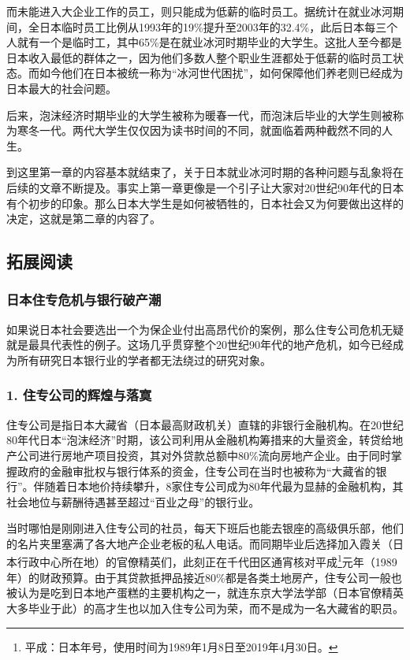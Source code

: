 而未能进入大企业工作的员工，则只能成为低薪的临时员工。据统计在就业冰河期间，全日本临时员工比例从1993年的19\%提升至2003年的32.4\%，此后日本每三个人就有一个是临时工，其中65\%是在就业冰河时期毕业的大学生。这批人至今都是日本收入最低的群体之一，因为他们多数人整个职业生涯都处于低薪的临时员工状态。而如今他们在日本被统一称为“冰河世代困扰”，如何保障他们养老则已经成为日本最大的社会问题。

后来，泡沫经济时期毕业的大学生被称为暖春一代，而泡沫后毕业的大学生则被称为寒冬一代。两代大学生仅仅因为读书时间的不同，就面临着两种截然不同的人生。

到这里第一章的内容基本就结束了，关于日本就业冰河时期的各种问题与乱象将在后续的文章不断提及。事实上第一章更像是一个引子让大家对20世纪90年代的日本有个初步的印象。那么日本大学生是如何被牺牲的，日本社会又为何要做出这样的决定，这就是第二章的内容了。

\subsection{拓展阅读}

\subsubsection{日本住专危机与银行破产潮}

{\fangsong 如果说日本社会要选出一个为保企业付出高昂代价的案例，那么住专公司危机无疑就是最具代表性的例子。这场几乎贯穿整个20世纪90年代的地产危机，如今已经成为所有研究日本银行业的学者都无法绕过的研究对象。\par}

\subsubsection{1. 住专公司的辉煌与落寞}

{\fangsong 住专公司是指日本大藏省（日本最高财政机关）直辖的非银行金融机构。在20世纪80年代日本“泡沫经济”时期，该公司利用从金融机构筹措来的大量资金，转贷给地产公司进行房地产项目投资，其对外贷款总额中80\%流向房地产企业。由于同时掌握政府的金融审批权与银行体系的资金，住专公司在当时也被称为“大藏省的银行”。伴随着日本地价持续攀升，8家住专公司成为80年代最为显赫的金融机构，其社会地位与薪酬待遇甚至超过“百业之母”的银行业。\par}

{\fangsong 当时哪怕是刚刚进入住专公司的社员，每天下班后也能去银座的高级俱乐部，他们的名片夹里塞满了各大地产企业老板的私人电话。而同期毕业后选择加入霞关（日本行政中心所在地）的官僚精英们，此刻正在千代田区通宵核对平成\footnote{平成：日本年号，使用时间为1989年1月8日至2019年4月30日。}元年（1989年）的财政预算。由于其贷款抵押品接近80\%都是各类土地房产，住专公司一般也被认为是吃到日本地产蛋糕的主要机构之一，就连东京大学法学部（日本官僚精英大多毕业于此）的高才生也以加入住专公司为荣，而不是成为一名大藏省的职员。\par}

